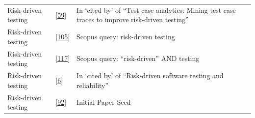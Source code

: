 \documentclass[]{book}
\begin{document}
\begin{longtable}[]{@{}lll@{}}
\begin{minipage}[t]{0.19\columnwidth}
Risk-driven testing\strut
\end{minipage} & \begin{minipage}[t]{0.41\columnwidth}\raggedright\strut
{[}\protect\hyperlink{ref-hemmati2018}{59}{]}\strut
\end{minipage} & \begin{minipage}[t]{0.32\columnwidth}\raggedright\strut
In `cited by' of ``Test case analytics: Mining test case traces to
improve risk-driven testing''\strut
\end{minipage}\tabularnewline
\begin{minipage}[t]{0.19\columnwidth}\raggedright\strut
Risk-driven testing\strut
\end{minipage} & \begin{minipage}[t]{0.41\columnwidth}\raggedright\strut
{[}\protect\hyperlink{ref-schneidewind2007}{105}{]}\strut
\end{minipage} & \begin{minipage}[t]{0.32\columnwidth}\raggedright\strut
Scopus query: risk-driven testing\strut
\end{minipage}\tabularnewline
\begin{minipage}[t]{0.19\columnwidth}\raggedright\strut
Risk-driven testing\strut
\end{minipage} & \begin{minipage}[t]{0.41\columnwidth}\raggedright\strut
{[}\protect\hyperlink{ref-vernotte2015}{117}{]}\strut
\end{minipage} & \begin{minipage}[t]{0.32\columnwidth}\raggedright\strut
Scopus query: ``risk-driven'' AND testing\strut
\end{minipage}\tabularnewline
\begin{minipage}[t]{0.19\columnwidth}\raggedright\strut
Risk-driven testing\strut
\end{minipage} & \begin{minipage}[t]{0.41\columnwidth}\raggedright\strut
{[}\protect\hyperlink{ref-atifi2017}{6}{]}\strut
\end{minipage} & \begin{minipage}[t]{0.32\columnwidth}\raggedright\strut
In `cited by' of ``Risk-driven software testing and reliability''\strut
\end{minipage}\tabularnewline
\begin{minipage}[t]{0.19\columnwidth}\raggedright\strut
Risk-driven testing\strut
\end{minipage} & \begin{minipage}[t]{0.41\columnwidth}\raggedright\strut
{[}\protect\hyperlink{ref-noor2015test}{92}{]}\strut
\end{minipage} & \begin{minipage}[t]{0.32\columnwidth}\raggedright\strut
Initial Paper Seed\strut
\end{minipage}\tabularnewline
\bottomrule
\end{longtable}
\end{document}
